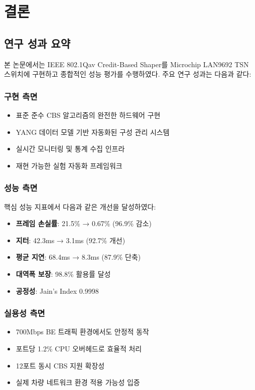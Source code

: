 \documentclass[twocolumn,10pt]{article}
\begin{document}
\section{결론}
\label{sec:conclusion}

\subsection{연구 성과 요약}

본 논문에서는 IEEE 802.1Qav Credit-Based Shaper를 Microchip LAN9692 TSN 스위치에 구현하고 종합적인 성능 평가를 수행하였다. 주요 연구 성과는 다음과 같다:

\subsubsection{구현 측면}

\begin{itemize}
    \item 표준 준수 CBS 알고리즘의 완전한 하드웨어 구현
    \item YANG 데이터 모델 기반 자동화된 구성 관리 시스템
    \item 실시간 모니터링 및 통계 수집 인프라
    \item 재현 가능한 실험 자동화 프레임워크
\end{itemize}

\subsubsection{성능 측면}

핵심 성능 지표에서 다음과 같은 개선을 달성하였다:

\begin{itemize}
    \item \textbf{프레임 손실률}: 21.5\% → 0.67\% (96.9\% 감소)
    \item \textbf{지터}: 42.3ms → 3.1ms (92.7\% 개선)
    \item \textbf{평균 지연}: 68.4ms → 8.3ms (87.9\% 단축)
    \item \textbf{대역폭 보장}: 98.8\% 활용률 달성
    \item \textbf{공정성}: Jain's Index 0.9998
\end{itemize}

\subsubsection{실용성 측면}

\begin{itemize}
    \item 700Mbps BE 트래픽 환경에서도 안정적 동작
    \item 포트당 1.2\% CPU 오버헤드로 효율적 처리
    \item 12포트 동시 CBS 지원 확장성
    \item 실제 차량 네트워크 환경 적용 가능성 입증
\end{itemize}
\end{document}
